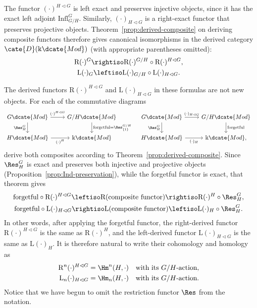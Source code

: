The functor $(\cdot)^{H\lhd G}$ is left exact and preserves injective
objects, since it has the exact left adjoint $\mathrm{Infl}^G_{G/H}$.
Similarly, $(\cdot)_{H\lhd G}$ is a right-exact functor that preserves
projective objects. Theorem~\ref{prop:derived-composite} on deriving composite
functors therefore gives canonical isomorphisms in the derived category
$\cate{D}(\Bbbk\dcate{Mod})$ (with appropriate parentheses omitted):
\begin{equation}\label{eqn:LHS-derived}
	\begin{gathered}
		\mathrm{R}(\cdot)^G\rightiso
		\mathrm{R}(\cdot)^{G/H}\circ\mathrm{R}(\cdot)^{H\lhd G},\\
		\mathrm{L}(\cdot)_G\leftiso
		\mathrm{L}(\cdot)_{G/H}\circ\mathrm{L}(\cdot)_{H\lhd G}.
	\end{gathered}
\end{equation}

The derived functors $\mathrm{R}(\cdot)^{H\lhd G}$ and
$\mathrm{L}(\cdot)_{H\lhd G}$ in these formulas are not new objects. For
each of the commutative diagrams
\[\begin{tikzcd}
	G\dcate{Mod} \arrow[r,"{(\cdot)^{H\lhd G}}"]
	\arrow[d,"{\Res^G_H}"'] & G/H\dcate{Mod}
	\arrow[d,"{\text{forgetful}=\Res^{G/H}_{\{1\}}}"]\\
	H\dcate{Mod} \arrow[r,"{(\cdot)^H}"'] & \Bbbk\dcate{Mod}
\end{tikzcd}\quad\begin{tikzcd}
	G\dcate{Mod} \arrow[r,"{(\cdot)_{H\lhd G}}"]
	\arrow[d,"{\Res^G_H}"'] & G/H\dcate{Mod}
	\arrow[d,"\text{forgetful}"]\\
	H\dcate{Mod} \arrow[r,"{(\cdot)_H}"'] & \Bbbk\dcate{Mod},
\end{tikzcd}\]
derive both composites according to Theorem~\ref{prop:derived-composite}.
Since $\Res^G_H$ is exact and preserves both injective and projective objects
(Proposition~\ref{prop:Ind-preservation}), while the forgetful functor is
exact, that theorem gives
\begin{gather*}
	\text{forgetful}\circ\mathrm{R}(\cdot)^{H\lhd G}
	\leftiso\mathrm{R}(\text{composite functor})
	\rightiso\mathrm{R}(\cdot)^H\circ\Res^G_H,\\
	\text{forgetful}\circ\mathrm{L}(\cdot)_{H\lhd G}
	\rightiso\mathrm{L}(\text{composite functor})
	\leftiso\mathrm{L}(\cdot)_H\circ\Res^G_H.
\end{gather*}
In other words, after applying the forgetful functor, the right-derived
functor $\mathrm{R}(\cdot)^{H\lhd G}$ is the same as
$\mathrm{R}(\cdot)^H$, and the left-derived functor
$\mathrm{L}(\cdot)_{H\lhd G}$ is the same as $\mathrm{L}(\cdot)_H$.
It is therefore natural to write their cohomology and homology as
\begin{align*}
	\mathrm{R}^n(\cdot)^{H\lhd G}
	&=\Hm^n(H,\cdot)\quad\text{with its $G/H$-action},\\
	\mathrm{L}_n(\cdot)_{H\lhd G}
	&=\Hm_n(H,\cdot)\quad\text{with its $G/H$-action}.
\end{align*}
Notice that we have begun to omit the restriction functor $\Res$ from the
notation.


